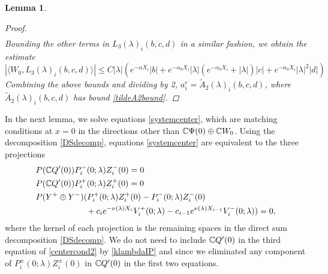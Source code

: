 \documentclass[12pt]{elsarticle}
\theoremstyle{plain}
\newtheorem{lemma}[theorem]{Lemma}
\theoremstyle{definition}
\theoremstyle{remark}
\numberwithin{theorem}{section}
\numberwithin{equation}{section}
\begin{document}
\begin{lemma}
\begin{proof}
\begin{align*}
\end{align*}
Bounding the other terms in $L_3(\lambda)_i(b, c, d)$ in a similar fashion, we obtain the estimate
\begin{equation}\label{W0L3bound}
|\langle W_0, L_3(\lambda)_i(b, c, d) \rangle| \leq C |\lambda| \left( e^{-\alpha X_i} |b| + e^{-\alpha_0 X_i} |\lambda|(e^{-\alpha_0 X_i} + |\lambda|) |c| + e^{-\alpha_0 X_i} |\lambda|^2 |d| \right)
\end{equation}
Combining the above bounds and dividing by 2, $a_i^c = \tilde{A}_2(\lambda)_i(b, c, d)$, where $\tilde{A}_2(\lambda)_i(b, c, d)$ has bound \cref{tildeA2bound}.
\end{proof}
\end{lemma}

In the next lemma, we solve equations \cref{systemcenter}, which are matching conditions at $x = 0$ in the directions other than $\mathbb{C} \Psi(0) \oplus \mathbb{C} W_0$. Using the decomposition \cref{DSdecomp}, equations \cref{systemcenter} are equivalent to the three projections
\begin{equation}\label{centercond2}
\begin{aligned}
&P(\mathbb{C} Q'(0) ) P_i^-(0; \lambda) Z_i^-(0) = 0 \\
&P(\mathbb{C} Q'(0) ) P_i^+(0; \lambda) Z_i^+(0) = 0 \\
&P(Y^+ \oplus Y^-) ( P_i^+(0; \lambda)Z_i^+(0) - P_i^-(0; \lambda) Z_i^-(0) \\
&\qquad\qquad\qquad + c_i e^{-\nu(\lambda)X_i}V_i^+(0; \lambda) - c_{i-1} e^{\nu(\lambda)X_{i-1}} V_i^-(0; \lambda) ) = 0,
\end{aligned}
\end{equation}
where the kernel of each projection is the remaining spaces in the direct sum decomposition \cref{DSdecomp}. We do not need to include $\mathbb{C} Q'(0)$ in the third equation of \cref{centercond2} by \cref{klambdaIP} and since we eliminated any component of $P_i^\pm(0; \lambda) Z_i^\pm(0)$ in $\mathbb{C} Q'(0)$ in the first two equations.
\end{document}
